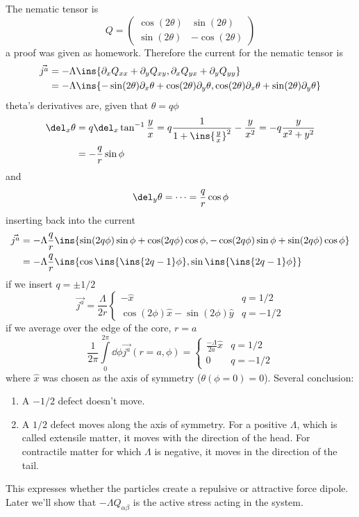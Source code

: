The nematic tensor is
\begin{equation}
    Q = \begin{pmatrix}
        \cos(2\theta)&\sin(2\theta)\\\sin(2\theta)&-\cos(2\theta)
    \end{pmatrix}
\end{equation}
a proof was given as homework. Therefore the current for the nematic tensor is
\begin{align}
    \vec{j^a} &= -\Lambda\ins{\partial_x Q_{xx}+\partial_y Q_{xy}, \partial_x Q_{yx}+\partial_y Q_{yy}} \\
    &= -\Lambda \ins{-\sin(2\theta)\partial_x\theta + \cos(2\theta)\partial_y\theta, \cos(2\theta)\partial_x\theta+\sin(2\theta)\partial_y\theta}
\end{align}
theta's derivatives are, given that \(\theta = q\phi \)
\begin{align}
    \del_x\theta &= q\del_x\tan^{-1}\frac{y}{x}= q\frac{1}{1+\ins{\frac{y}{x}}^2}-\frac{y}{x^2} = -q\frac{y}{x^2+y^2} \\
    &= -\frac{q}{r}\sin\phi
\end{align}
and
\begin{align}
    \del_y\theta = \cdots = \frac{q}{r}\cos\phi
\end{align}
inserting back into the current
\begin{align}
    \vec{j^a} &= -\Lambda\frac{q}{r}\ins{\sin(2q\phi)\sin\phi+\cos(2q\phi)\cos\phi, - \cos(2q\phi)\sin\phi+\sin(2q\phi)\cos\phi}\\
    &= -\Lambda\frac{q}{r}\ins{\cos\ins{\ins{2q-1}\phi},\sin\ins{\ins{2q-1}\phi}}
\end{align}
if we insert \(q=\pm 1/2 \)
\begin{equation}
    \vec{j^a} = \frac{\Lambda}{2r} \begin{cases}
        -\hat{x} & q=1/2 \\
        \cos(2\phi)\hat{x} - \sin(2\phi)\hat{y} & q=-1/2
    \end{cases}
\end{equation}
if we average over the edge of the core, \(r=a\)
\begin{equation}
    \frac{1}{2\pi}\int\limits_0^{2\pi}\dd\phi \vec{j^a}(r=a,\phi) = \begin{cases}
        \frac{-\Lambda}{2a}\hat{x} & q=1/2 \\
        0 & q=-1/2
    \end{cases}
\end{equation}
where \(\hat{x}\) was chosen as the axis of symmetry (\(\theta(\phi=0)=0\)). Several conclusion:
\begin{enumerate}
    \item A \(-1/2\) defect doesn't move.
    \item A \(1/2\) defect moves along the axis of symmetry. For a positive \(\Lambda \), which is called extensile matter, it moves with the direction of the head. For contractile matter for which \(\Lambda\) is negative, it moves in the direction of the tail.
\end{enumerate}
This expresses whether the particles create a repulsive or attractive force dipole. Later we'll show that \(-\Lambda Q_{\alpha\beta}\) is the active stress acting in the system.
